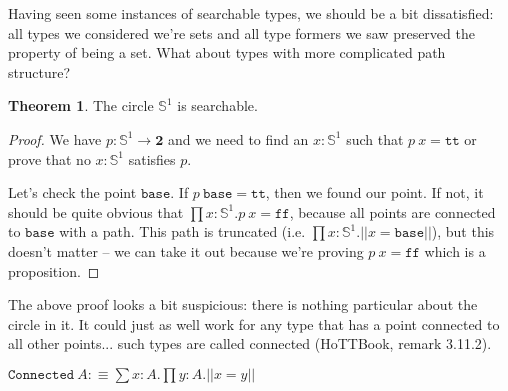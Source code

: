 \documentclass[11pt]{article}
\theoremstyle{definition}
\newtheorem{theorem}{Theorem}[section]
\newcommand{\txt}[1]{\texttt{#1}}
\newcommand{\text}[1]{\texttt{#1}}
\renewcommand{\(}{\left(}
\renewcommand{\)}{\right)}
\newcommand{\defn}{:\equiv}
\newcommand{\apl}[2]{#1\ #2}
\newcommand{\Bool}{\mathbf{2}}
\newcommand{\true}{\txt{tt}}
\newcommand{\false}{\txt{ff}}
\newcommand{\dprod}[2]{\prod #1.#2}
\newcommand{\dsum}[2]{\sum #1.#2}
\newcommand{\hS}{\mathbb{S}^1}
\newcommand{\base}{\text{base}}
\newcommand{\trf}[1]{||#1||}
\begin{document}
Having seen some instances of searchable types, we should be a bit dissatisfied: all types we considered we're sets and all type formers we saw preserved the property of being a set. What about types with more complicated path structure?

\newcommand{\Circle}{\hS}
\begin{theorem}
The circle $\Circle$ is searchable.
\end{theorem}
\begin{proof}
We have $p : \Circle \to \Bool$ and we need to find an $x : \Circle$ such that $\apl{p}{x} = \true$ or prove that no $x : \Circle$ satisfies $p$.

Let's check the point $\base$. If $\apl{p}{\base} = \true$, then we found our point. If not, it should be quite obvious that $\dprod{x : \Circle}{\apl{p}{x} = \false}$, because all points are connected to $\base$ with a path. This path is truncated (i.e. $\dprod{x : \Circle}{\trf{x = \base}}$), but this doesn't matter -- we can take it out because we're proving $\apl{p}{x} = \false$ which is a proposition.
\end{proof}

The above proof looks a bit suspicious: there is nothing particular about the circle in it. It could just as well work for any type that has a point connected to all other points... such types are called connected (HoTTBook, remark 3.11.2).

\newcommand{\Connected}{\txt{Connected}}
$\apl{\Connected}{A} \defn \dsum{x : A}{\dprod{y : A}{\trf{x = y}}}$
\end{document}
